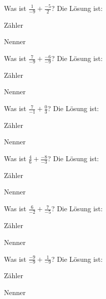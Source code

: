 \documentclass{ximera}
\begin{document}
\begin{shuffle}
\begin{question}
Was ist $\frac{1}{-9} + \frac{-5}{2}$?
Die Lösung ist:
\begin{solution}
Zähler 
\end{solution}
\begin{solution}
Nenner 
\end{solution}
\end{question}


\begin{question}
Was ist $\frac{7}{-9} + \frac{-6}{-9}$?
Die Lösung ist:
\begin{solution}
Zähler 
\end{solution}
\begin{solution}
Nenner 
\end{solution}
\end{question}


\begin{question}
Was ist $\frac{7}{-1} + \frac{0}{3}$?
Die Lösung ist:
\begin{solution}
Zähler 
\end{solution}
\begin{solution}
Nenner 
\end{solution}
\end{question}


\begin{question}
Was ist $\frac{4}{6} + \frac{-8}{-3}$?
Die Lösung ist:
\begin{solution}
Zähler 
\end{solution}
\begin{solution}
Nenner 
\end{solution}
\end{question}


\begin{question}
Was ist $\frac{6}{-2} + \frac{7}{-5}$?
Die Lösung ist:
\begin{solution}
Zähler 
\end{solution}
\begin{solution}
Nenner 
\end{solution}
\end{question}


\begin{question}
Was ist $\frac{-9}{-9} + \frac{1}{-9}$?
Die Lösung ist:
\begin{solution}
Zähler 
\end{solution}
\begin{solution}
Nenner 
\end{solution}
\end{question}



\end{shuffle}
\end{document}
